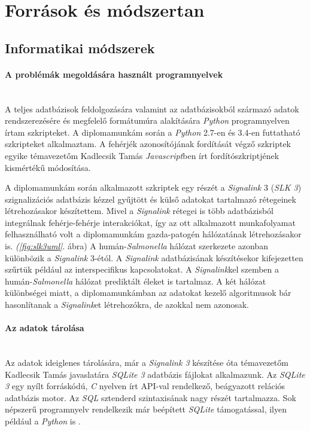 \documentclass[a4paper,12pt]{article}
\begin{document}
\section{Források és módszertan}

	\subsection{Informatikai módszerek}
			\paragraph{A problémák megoldására használt programnyelvek} \mbox{}\\
			A teljes adatbázisok feldolgozására valamint az adatbázisokból származó adatok rendszerezésére és megfelelő formátumúra alakítására \textit{Python} programnyelven írtam szkripteket. A diplomamunkám során a \textit{Python} 2.7-en és 3.4-en futtatható szkripteket alkalmaztam. A fehérjék azonosítójának fordítását végző szkriptek egyike témavezetőm Kadlecsik Tamás \textit{Javascript}ben írt fordítószkriptjének kismértékű módosítása.

			A diplomamunkám során alkalmazott szkriptek egy részét a \textit{Signalink} 3 (\textit{SLK 3}) szignalizációs adatbázis kézzel gyűjtött és külső adatokat tartalmazó rétegeinek létrehozásakor készítettem.  Mivel a \textit{Signalink} rétegei is több adatbázisból integrálnak fehérje-fehérje interakciókat, így az ott alkalmazott munkafolyamat felhasználható volt a diplomamunkám gazda-patogén hálózatának létrehozásakor is. \textit{(\ref{fig:slk3uml}}. ábra) A humán-\textit{Salmonella} hálózat szerkezete azonban különbözik a \textit{Signalink} 3-étól. A \textit{Signalink} adatbázisának készítésekor kifejezetten szűrtük például az interspecifikus kapcsolatokat. A \textit{Signalink}kel szemben a humán-\textit{Salmonella} hálózat prediktált éleket is tartalmaz. A két hálózat különbségei miatt, a diplomamunkámban az adatokat kezelő algoritmusok bár hasonlítanak a \textit{Signalink}et létrehozókra, de azokkal nem azonosak.

			\paragraph{Az adatok tárolása} \mbox{}\\
			Az adatok ideiglenes tárolására, már a \textit{Signalink 3} készítése óta témavezetőm Kadlecsik Tamás javaslatára \textit{SQLite 3} adatbázis fájlokat alkalmazunk. Az \textit{SQLite 3} egy nyílt forráskódú, \textit{C} nyelven írt API-val rendelkező, beágyazott relációs adatbázis motor. Az \textit{SQL} sztenderd szintaxisának nagy részét tartalmazza. Sok népszerű programnyelv rendelkezik már beépített \textit{SQLite} támogatással, ilyen például a \textit{Python} is \cite{sqlite3}.
\end{document}
